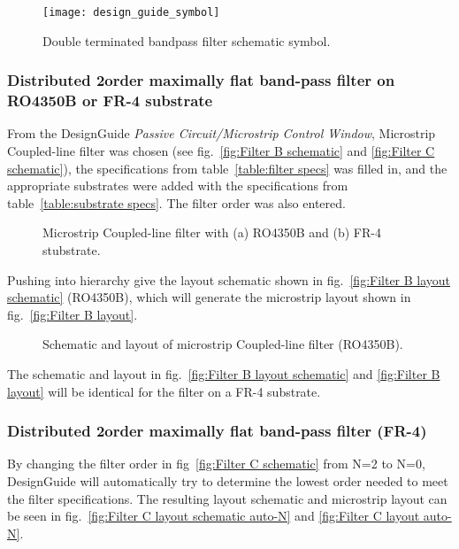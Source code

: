 \documentclass[report.tex]{subfiles}
\begin{document}
\begin{figure}[H]
    \centering
    \texttt{[image: design\_guide\_symbol]}
    \caption{Double terminated bandpass filter schematic symbol.}
    \label{fig:Filter A}
\end{figure}

\subsubsection{Distributed 2\nd order maximally flat band-pass filter on RO4350B or FR-4 substrate}
From the DesignGuide \emph{Passive Circuit/Microstrip Control Window}, Microstrip Coupled-line filter was chosen (see fig.~\ref{fig:Filter B schematic} and \ref{fig:Filter C schematic}), the specifications from table~\ref{table:filter specs} was filled in, and the appropriate substrates were added with the specifications from table~\ref{table:substrate specs}. The filter order was also entered.

\begin{figure}[h]
    \centering
    \caption{Microstrip Coupled-line filter with (a) RO4350B and (b) FR-4 stubstrate.}
\end{figure}

Pushing into hierarchy give the layout schematic shown in fig.~\ref{fig:Filter B layout schematic} (RO4350B), which will generate the microstrip layout shown in fig.~\ref{fig:Filter B layout}.

\begin{figure}[h]
    \centering
    
    \caption{Schematic and layout of microstrip Coupled-line filter (RO4350B).}
\end{figure}

The schematic and layout in fig.~\ref{fig:Filter B layout schematic} and \ref{fig:Filter B layout} will be identical for the filter on a FR-4 substrate.

\subsubsection{Distributed 2\nd order maximally flat band-pass filter (FR-4)}
By changing the filter order in fig~\ref{fig:Filter C schematic} from N=2 to N=0, DesignGuide will automatically try to determine the lowest order needed to meet the filter specifications. The resulting layout schematic and microstrip layout can be seen in fig.~\ref{fig:Filter C layout schematic auto-N} and \ref{fig:Filter C layout auto-N}.
\end{document}

